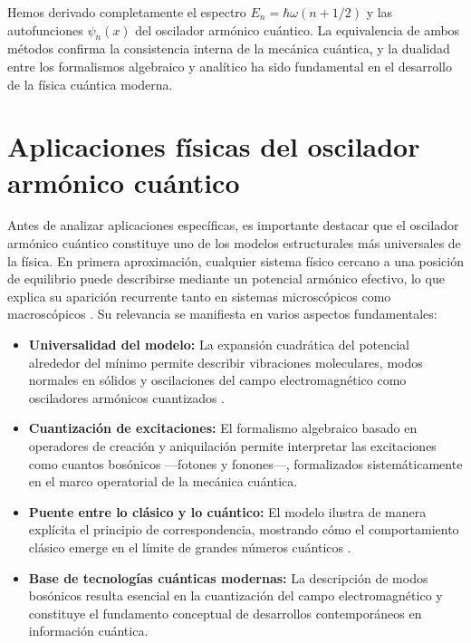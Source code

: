 Hemos derivado completamente el espectro $E_n = \hbar\omega(n + 1/2)$ y las autofunciones $\psi_n(x)$ del oscilador armónico cuántico. La equivalencia de ambos métodos confirma la consistencia interna de la mecánica cuántica, y la dualidad entre los formalismos algebraico y analítico ha sido fundamental en el desarrollo de la física cuántica moderna.





\section{Aplicaciones físicas del oscilador armónico cuántico}
Antes de analizar aplicaciones específicas, es importante destacar que el oscilador armónico cuántico constituye uno de los modelos estructurales más universales de la física. En primera aproximación, cualquier sistema físico cercano a una posición de equilibrio puede describirse mediante un potencial armónico efectivo, lo que explica su aparición recurrente tanto en sistemas microscópicos como macroscópicos \citep{cohen1977, griffiths2018}.
Su relevancia se manifiesta en varios aspectos fundamentales:
\begin{itemize}
    \item \textbf{Universalidad del modelo:} La expansión cuadrática del potencial alrededor del mínimo permite describir vibraciones moleculares, modos normales en sólidos y oscilaciones del campo electromagnético como osciladores armónicos cuantizados \citep{einstein1907, debye1912}.
    \item \textbf{Cuantización de excitaciones:} El formalismo algebraico basado en operadores de creación y aniquilación \citep{dirac1930} permite interpretar las excitaciones como cuantos bosónicos —fotones y fonones—, formalizados sistemáticamente en el marco operatorial de la mecánica cuántica.
    \item \textbf{Puente entre lo clásico y lo cuántico:} El modelo ilustra de manera explícita el principio de correspondencia, mostrando cómo el comportamiento clásico emerge en el límite de grandes números cuánticos \citep{ehrenfest1927}.
    \item \textbf{Base de tecnologías cuánticas modernas:} La descripción de modos bosónicos resulta esencial en la cuantización del campo electromagnético \citep{dirac1927} y constituye el fundamento conceptual de desarrollos contemporáneos en información cuántica.
\end{itemize}
